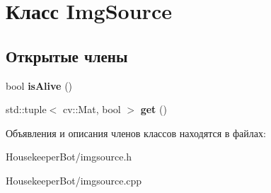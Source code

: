 \hypertarget{classImgSource}{}\section{Класс Img\+Source}
\label{classImgSource}
\subsection*{Открытые члены}
\begin{DoxyCompactItemize}
\item 
\mbox{\label{classImgSource_a31462700a8fbb18f48198e3b3a12c7c6}} 
bool {\bfseries is\+Alive} ()
\item 
\mbox{\label{classImgSource_adf1ee06394c4a69ccbef8167f7f9ac49}} 
std\+::tuple$<$ cv\+::\+Mat, bool $>$ {\bfseries get} ()
\end{DoxyCompactItemize}


Объявления и описания членов классов находятся в файлах\+:\begin{DoxyCompactItemize}
\item 
Housekeeper\+Bot/imgsource.\+h\item 
Housekeeper\+Bot/imgsource.\+cpp\end{DoxyCompactItemize}
